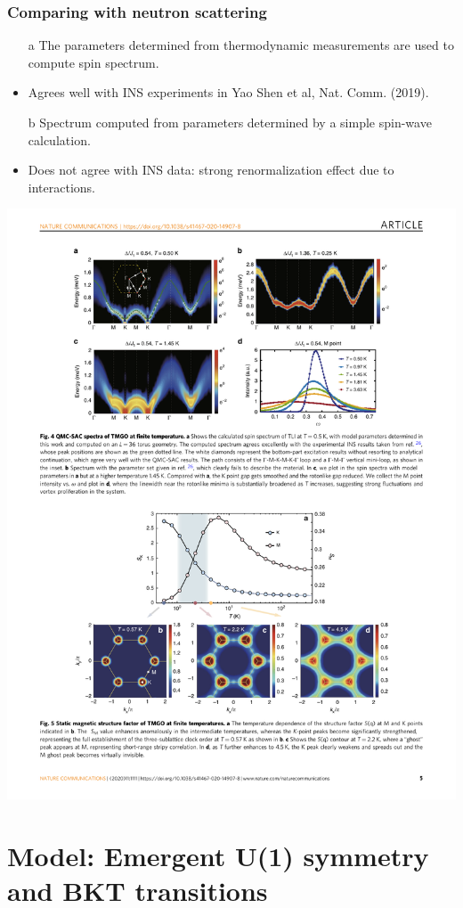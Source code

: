 \documentclass[xcolor=table, aspectratio=1610,ignorenonframetext]{beamer}
\begin{document}
\begin{frame}
  \frametitle{Comparing with neutron scattering}
  \begin{itemize}
    \item[a] The parameters determined from thermodynamic measurements are used to compute spin spectrum.
    \item Agrees well with INS experiments in Yao Shen et al, Nat. Comm. (2019).
    \item[b] Spectrum computed from parameters determined by a simple spin-wave calculation.
    \item Does not agree with INS data: strong renormalization effect due to interactions.
  \end{itemize}
  \begin{center}
    \includegraphics{spinwave-fit}
  \end{center}
\end{frame}

\section{Model: Emergent U(1) symmetry and BKT transitions}
\end{document}

